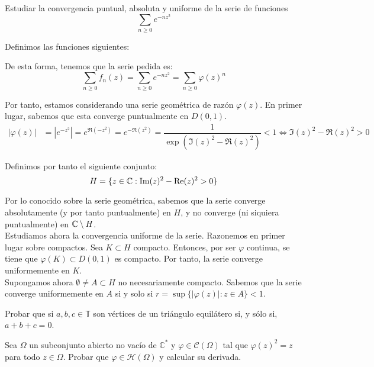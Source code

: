 \begin{ejercicio}
    Estudiar la convergencia puntual, absoluta y uniforme de la serie de funciones
    \[
        \sum_{n\geq 0} e^{-nz^2}
    \]

    Definimos las funciones siguientes:

    De esta forma, tenemos que la serie pedida es:
    \[
        \sum_{n\geq 0} f_n(z) = \sum_{n\geq 0} e^{-nz^2} = \sum_{n\geq 0} \varphi(z)^n
    \]

    Por tanto, estamos considerando una serie geométrica de razón $\varphi(z)$. En primer lugar, sabemos que esta converge puntualmente en $D(0,1)$.
    \begin{align*}
        |\varphi(z)| &= |e^{-z^2}| = e^{\Re(-z^2)} = e^{-\Re(z^2)} = \dfrac{1}{\exp(\Im(z)^2 - \Re(z)^2)} <1\iff \Im(z)^2 - \Re(z)^2 > 0
    \end{align*}

    Definimos por tanto el siguiente conjunto:
    \begin{equation*}
        H=\{z\in \mathbb{C} : \operatorname{Im}(z)^2 - \operatorname{Re}(z)^2 > 0\}
    \end{equation*}

    Por lo conocido sobre la serie geométrica, sabemos que la serie converge absolutamente (y por tanto puntualmente) en $H$, y no converge (ni siquiera puntualmente) en $\mathbb{C}\setminus H$.\\

    Estudiamos ahora la convergencia uniforme de la serie. Razonemos en primer lugar sobre compactos. Sea $K\subset H$ compacto. Entonces, por ser $\varphi$ continua, se tiene que $\varphi(K)\subset D(0,1)$ es compacto. Por tanto, la serie converge uniformemente en $K$.\\

    Supongamos ahora $\emptyset\neq A\subset H$ no necesariamente compacto. Sabemos que la serie converge uniformemente en $A$ si y solo si $r=\sup\{|\varphi(z)| : z\in A\} < 1$.
\end{ejercicio}

\begin{ejercicio}
    Probar que si $a,b,c \in \mathbb{T}$ son vértices de un triángulo equilátero si, y sólo si, $a+b+c = 0$.
\end{ejercicio}

\begin{ejercicio}
    Sea $\Omega$ un subconjunto abierto no vacío de $\mathbb{C}^*$ y $\varphi \in \mathcal{C}(\Omega)$ tal que $\varphi(z)^2 = z$ para todo $z \in \Omega$. Probar que $\varphi \in \mathcal{H}(\Omega)$ y calcular su derivada.
\end{ejercicio}

